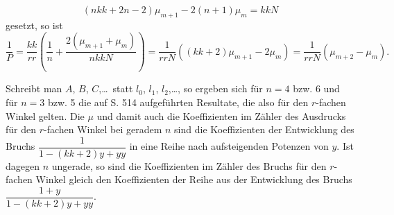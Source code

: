 \[
(nkk+2n-2)\mu_{m+1}-2(n+1)\mu_m=kkN
\]
\noindent gesetzt, so ist
\[
\frac1P=\frac{kk}{rr}\left(\frac1n+\frac{2(\mu_{m+1}+\mu_m)}{nkkN}\right)
=\frac1{rrN}((kk+2)\mu_{m+1}-2\mu_m)=\frac1{rrN}(\mu_{m+2}-\mu_m).
\]
\par\noindent\hspace*{\parindent}Schreibt man $A$, $B$, $C$,\ldots\ statt $l_0$, $l_1$, $l_2$,\ldots, so ergeben sich für $n=4$ bzw. 6 und für $n=3$ bzw. 5 die auf S. 514 aufgeführten Resultate, die also für den $r$-fachen Winkel gelten. Die $\mu$ und damit auch die Koeffizienten im Zähler des Ausdrucks für den $r$-fachen Winkel bei geradem $n$ sind die Koeffizienten der Entwicklung des Bruchs $\dfrac1{1-(kk+2)y+yy}$ in eine Reihe nach aufsteigenden Potenzen von $y$. Ist dagegen $n$ ungerade, so sind die Koeffizienten im Zähler des Bruchs für den $r$-fachen Winkel gleich den Koeffizienten der Reihe aus der Entwicklung des Bruchs $\dfrac{1+y}{1-(kk+2)y+yy}$.
\par\endgroup
